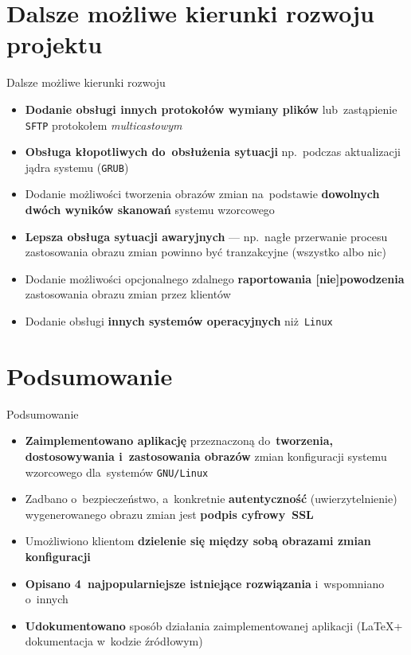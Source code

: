 \documentclass[notes,polish,xcolor=dvipsnames,hyperref={unicode,hidelinks,pdftex,pdfauthor={Patryk Bęza},pdftitle={Protokół zarządzania stacjami komputerowymi pod kontrolą systemu Linux},pdfsubject={Praca dyplomowa magisterska na Wydziale Matematyki i Nauk Informacyjnych Politechniki Warszawskiej},pdfkeywords={Software Configuration Management, SCM, Infrastructure as Code, IaC, Linux, Communications Protocol},pdfproducer={XeLaTeX},pdfcreator={latexmk}}]{beamer}
\begin{document}

\section{Dalsze możliwe kierunki rozwoju projektu}

\begin{frame}{Dalsze możliwe kierunki rozwoju}

\begin{itemize}
	\item \textbf{Dodanie obsługi innych protokołów wymiany plików} lub~zastąpienie \texttt{SFTP} protokołem \emph{multicastowym}
	\item \textbf{Obsługa kłopotliwych do~obsłużenia sytuacji} np.~podczas aktualizacji jądra systemu (\texttt{GRUB})
	\item Dodanie możliwości tworzenia obrazów zmian na~podstawie \textbf{dowolnych dwóch wyników skanowań} systemu wzorcowego
	\item \textbf{Lepsza obsługa sytuacji awaryjnych} --- np.~nagłe przerwanie procesu zastosowania obrazu zmian powinno być tranzakcyjne (wszystko albo nic)
	\item Dodanie możliwości opcjonalnego zdalnego \textbf{raportowania [nie]powodzenia} zastosowania obrazu zmian przez klientów
	\item Dodanie obsługi \textbf{innych systemów operacyjnych} niż~\texttt{Linux}
\end{itemize}

\end{frame}


\section{Podsumowanie}

\begin{frame}{Podsumowanie}

\begin{itemize}
	\item \textbf{Zaimplementowano aplikację} przeznaczoną do~\textbf{tworzenia, dostosowywania i~zastosowania obrazów} zmian konfiguracji systemu wzorcowego dla~systemów \texttt{GNU/Linux}
	\item Zadbano o~bezpieczeństwo, a~konkretnie \textbf{autentyczność} (uwierzytelnienie) wygenerowanego obrazu zmian jest \textbf{podpis cyfrowy~SSL}
	\item Umożliwiono klientom \textbf{dzielenie się między sobą obrazami zmian konfiguracji}
	\item \textbf{Opisano 4~najpopularniejsze istniejące rozwiązania} i~wspomniano o~innych
	\item \textbf{Udokumentowano} sposób działania zaimplementowanej aplikacji (\LaTeX + dokumentacja w~kodzie źródłowym)
\end{itemize}

\end{frame}
\end{document}
